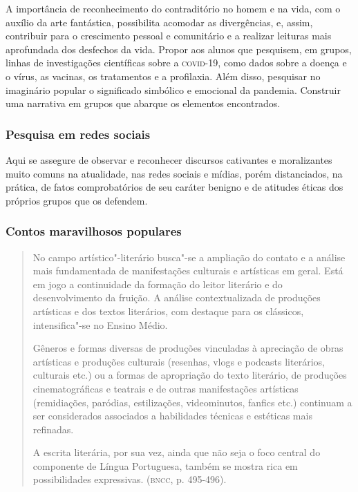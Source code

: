 \documentclass[12pt]{extarticle}
\begin{document}
A importância de reconhecimento do contraditório no homem e na vida,
com o auxílio da arte fantástica, possibilita acomodar as
divergências, e, assim, contribuir para o crescimento pessoal e
comunitário e a realizar leituras mais aprofundada dos desfechos da
vida. Propor aos alunos que pesquisem, em grupos, linhas de
investigações científicas sobre a \textsc{covid}-19, como dados sobre a doença
e o vírus, as vacinas, os tratamentos e a profilaxia. Além disso,
pesquisar no imaginário popular o significado simbólico e emocional da
pandemia. Construir uma narrativa em grupos que abarque os elementos
encontrados.

\subsubsection{Pesquisa em redes sociais}


Aqui se assegure de observar e reconhecer discursos cativantes e
moralizantes muito comuns na atualidade, nas redes sociais e mídias,
porém distanciados, na prática, de fatos comprobatórios de seu caráter
benigno e de atitudes éticas dos próprios grupos que os defendem.

\subsubsection{Contos maravilhosos populares}

\begin{quote}
No campo artístico"-literário busca"-se a ampliação do contato e a
análise mais fundamentada de manifestações culturais e artísticas em
geral. Está em jogo a continuidade da formação do leitor literário e do
desenvolvimento da fruição. A análise contextualizada de produções
artísticas e dos textos literários, com destaque para os clássicos,
intensifica"-se no Ensino Médio. 

Gêneros e formas diversas de produções
vinculadas à apreciação de obras artísticas e produções culturais
(resenhas, vlogs e podcasts literários, culturais etc.) ou a formas de
apropriação do texto literário, de produções cinematográficas e teatrais
e de outras manifestações artísticas (remidiações, paródias,
estilizações, videominutos, fanfics etc.) continuam a ser considerados
associados a habilidades técnicas e estéticas mais refinadas.

A escrita literária, por sua vez, ainda que não seja o foco central do
componente de Língua Portuguesa, também se mostra rica em possibilidades
expressivas. (\textsc{bncc}, p. 495-496).
\end{quote}
\end{document}
